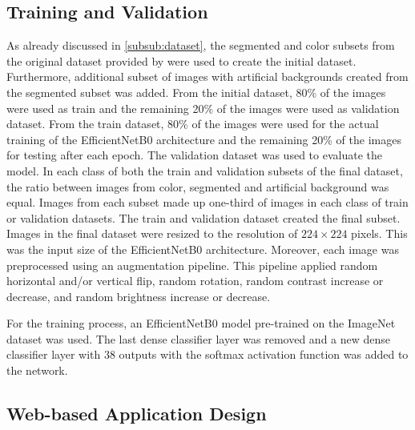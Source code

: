 \documentclass{BachelorBUI}
\begin{document}
    \subsection{Training and Validation}
    As already discussed in \autoref{subsub:dataset}, the segmented and color subsets from the original dataset provided by \textcite{Mohanty:2016} were used to create the initial dataset. Furthermore, additional subset of images with artificial backgrounds created from the segmented subset was added. From the initial dataset, 80\% of the images were used as train and the remaining 20\% of the images were used as validation dataset. From the train dataset, 80\% of the images were used for the actual training of the EfficientNetB0 architecture and the remaining 20\% of the images for testing after each epoch. The validation dataset was used to evaluate the model. In each class of both the train and validation subsets of the final dataset, the ratio between images from color, segmented and artificial background was equal. Images from each subset made up one-third of images in each class of train or validation datasets. The train and validation dataset created the final subset. Images in the final dataset were resized to the resolution of $224 \times 224$ pixels. This was the input size of the EfficientNetB0 architecture. Moreover, each image was preprocessed using an augmentation pipeline. This pipeline applied  random horizontal and/or vertical flip, random rotation, random contrast increase or decrease, and random brightness increase or decrease.

    For the training process, an EfficientNetB0 model pre-trained on the ImageNet dataset was used. The last dense classifier layer was removed and a new dense classifier layer with 38 outputs with the softmax activation function was added to the network.
    \subsection{Web-based Application Design}
\end{document}
